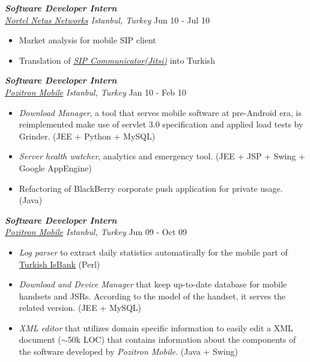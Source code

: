 \documentclass[line, margin]{res}
\begin{document}
\begin{resume}
	{\sl \textbf{Software Developer Intern} \\ \href{http://en.netas.com.tr/default.aspx}{Nortel Netas Networks} Istanbul, Turkey} \hfill Jun 10 - Jul 10 \\
	\vspace{-0.3cm}
	\begin{itemize} \itemsep -2pt
		\item Market analysis for mobile SIP client
		\item Translation of \textit{\href{https://jitsi.org/}{SIP Communicator(Jitsi)}} into Turkish 
	\end{itemize}

	{\sl \textbf{Software Developer Intern} \\ \href{http://www.pozitron.com/}{Pozitron Mobile} Istanbul, Turkey} \hfill Jan 10 - Feb 10 \\
	\vspace{-0.3cm}
	\begin{itemize} \itemsep -2pt
		\item \textit{Download Manager}, a tool that serves mobile software at pre-Android era, is reimplemented make use of servlet 3.0 specification and applied load tests by Grinder. (JEE + Python + MySQL)
		\item \textit{Server health watcher}, analytics and emergency tool. (JEE + JSP + Swing + Google AppEngine)
		\item Refactoring of BlackBerry corporate push application for private usage. (Java)
	\end{itemize}							

	{\sl \textbf{Software Developer Intern} \\ \href{http://www.pozitron.com/}{Pozitron Mobile} Istanbul, Turkey} \hfill Jun 09 - Oct 09\\
	\vspace{-0.3cm}
	\begin{itemize} \itemsep -2pt
		\item \textit{Log parser} to extract daily statistics automatically for the mobile part of \href{http://www.isbank.com.tr/English/}{Turkish IsBank} (Perl)
		\item \textit{Download and Device Manager} that keep up-to-date database for mobile handsets  and JSRs. According to the model of the handset, it serves the related version. (JEE + MySQL)
		\item \textit{XML editor} that utilizes domain specific information to easily edit a XML document ($\sim$50k LOC) that contains information about the components of the software developed by \textit{Pozitron Mobile}. (Java + Swing)
	\end{itemize}


\end{resume}
\end{document}
